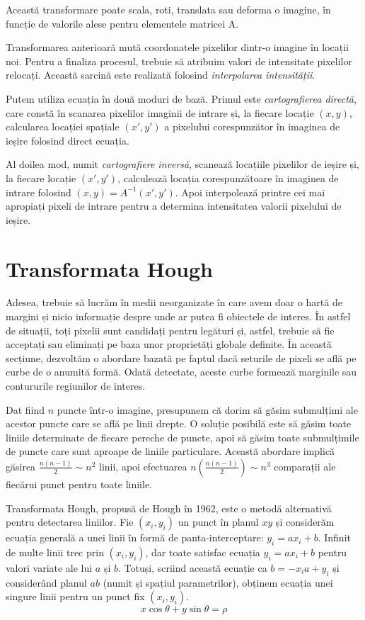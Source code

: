 \documentclass[a4paper,12pt]{report}
\begin{document}
Această transformare poate scala, roti, translata sau deforma o imagine, în funcție de valorile alese pentru elementele matricei A.

Transformarea anterioară mută coordonatele pixelilor dintr-o imagine în locații noi. Pentru a finaliza procesul, trebuie să atribuim valori de intensitate pixelilor relocați. Această sarcină este realizată folosind \textit{interpolarea intensității}.

Putem utiliza ecuația în două moduri de bază. Primul este \textit{cartografierea directă}, care constă în scanarea pixelilor imaginii de intrare și, la fiecare locație $(x, y)$, calcularea locației spațiale $(x', y')$ a pixelului corespunzător în imaginea de ieșire folosind direct ecuația.

Al doilea mod, numit \textit{cartografiere inversă}, scanează locațiile pixelilor de ieșire și, la fiecare locație $(x', y')$, calculează locația corespunzătoare în imaginea de intrare folosind $(x, y) = A^{-1}(x', y')$. Apoi interpolează printre cei mai apropiați pixeli de intrare pentru a determina intensitatea valorii pixelului de ieșire.

\section{Transformata Hough}
Adesea, trebuie să lucrăm în medii neorganizate în care avem doar o hartă de margini și nicio informație despre unde ar putea fi obiectele de interes. În astfel de situații, toți pixelii sunt candidați pentru legături și, astfel, trebuie să fie acceptați sau eliminați pe baza unor proprietăți globale definite. În această secțiune, dezvoltăm o abordare bazată pe faptul dacă seturile de pixeli se află pe curbe de o anumită formă. Odată detectate, aceste curbe formează marginile sau contururile regiunilor de interes.

Dat fiind $n$ puncte într-o imagine, presupunem că dorim să găsim submulțimi ale acestor puncte care se află pe linii drepte. O soluție posibilă este să găsim toate liniile determinate de fiecare pereche de puncte, apoi să găsim toate submulțimile de puncte care sunt aproape de liniile particulare. Această abordare implică găsirea $\frac{n(n-1)}{2} \sim n^2$ linii, apoi efectuarea $n \left(\frac{n(n-1)}{2}\right) \sim n^3$ comparații ale fiecărui punct pentru toate liniile.

Transformata Hough, propusă de Hough în 1962, este o metodă alternativă pentru detectarea liniilor. Fie $(x_i, y_i)$ un punct în planul $xy$ și considerăm ecuația generală a unei linii în formă de panta-interceptare: $y_i = ax_i + b$. Infinit de multe linii trec prin $(x_i, y_i)$, dar toate satisfac ecuația $y_i = ax_i + b$ pentru valori variate ale lui $a$ și $b$. Totuși, scriind această ecuație ca $b = -x_i a + y_i$ și considerând planul $ab$ (numit și spațiul parametrilor), obținem ecuația unei singure linii pentru un punct fix $(x_i, y_i)$.
\[
    x \cos \theta + y \sin \theta = \rho
\]
\end{document}
